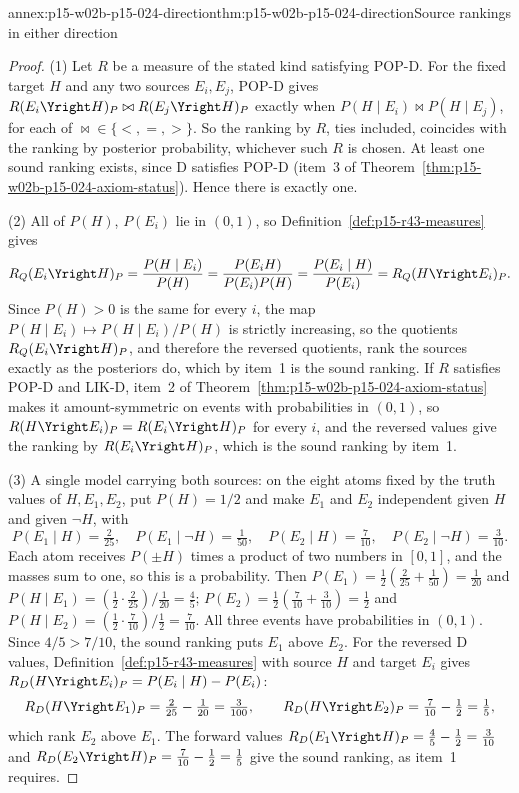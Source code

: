 \begin{annexitem}{annex:p15-w02b-p15-024-direction}{thm:p15-w02b-p15-024-direction}{Source rankings in either direction}
\begin{proof}
(1) Let \(R\) be a measure of the stated kind satisfying POP-D. For
the fixed target \(H\) and any two sources \(E_i,E_j\), POP-D gives
\(R(E_i\Yright H)_P\bowtie R(E_j\Yright H)_P\) exactly when
\(P(H\mid E_i)\bowtie P(H\mid E_j)\), for each of
\(\bowtie\in\{<,=,>\}\). So the ranking by \(R\), ties included,
coincides with the ranking by posterior probability, whichever such
\(R\) is chosen. At least one sound ranking exists, since D satisfies
POP-D (item~3 of Theorem~\ref{thm:p15-w02b-p15-024-axiom-status}).
Hence there is exactly one.

(2) All of \(P(H)\), \(P(E_i)\) lie in \((0,1)\), so
Definition~\ref{def:p15-r43-measures} gives
\[
 R_Q(E_i\Yright H)_P=\frac{P(H\mid E_i)}{P(H)}
 =\frac{P(E_iH)}{P(E_i)P(H)}
 =\frac{P(E_i\mid H)}{P(E_i)}=R_Q(H\Yright E_i)_P .
\]
Since \(P(H)>0\) is the same for every \(i\), the map
\(P(H\mid E_i)\mapsto P(H\mid E_i)/P(H)\) is strictly increasing, so the
quotients \(R_Q(E_i\Yright H)_P\), and therefore the reversed quotients,
rank the sources exactly as the posteriors do, which by item~1 is the
sound ranking. If \(R\) satisfies POP-D and LIK-D, item~2 of
Theorem~\ref{thm:p15-w02b-p15-024-axiom-status} makes it
amount-symmetric on events with probabilities in \((0,1)\), so
\(R(H\Yright E_i)_P=R(E_i\Yright H)_P\) for every \(i\), and the
reversed values give the ranking by \(R(E_i\Yright H)_P\), which is
the sound ranking by item~1.

(3) A single model carrying both sources: on the eight atoms fixed by
the truth values of \(H,E_1,E_2\), put \(P(H)=1/2\) and make \(E_1\)
and \(E_2\) independent given \(H\) and given \(\neg H\), with
\[
 P(E_1\mid H)=\tfrac2{25},\quad P(E_1\mid\neg H)=\tfrac1{50},\quad
 P(E_2\mid H)=\tfrac7{10},\quad P(E_2\mid\neg H)=\tfrac3{10}.
\]
Each atom receives \(P(\pm H)\) times a product of two numbers in
\([0,1]\), and the masses sum to one, so this is a probability. Then
\(P(E_1)=\tfrac12(\tfrac2{25}+\tfrac1{50})=\tfrac1{20}\) and
\(P(H\mid E_1)=(\tfrac12\cdot\tfrac2{25})/\tfrac1{20}=\tfrac45\);
\(P(E_2)=\tfrac12(\tfrac7{10}+\tfrac3{10})=\tfrac12\) and
\(P(H\mid E_2)=(\tfrac12\cdot\tfrac7{10})/\tfrac12=\tfrac7{10}\). All
three events have probabilities in \((0,1)\). Since
\(4/5>7/10\), the sound ranking puts \(E_1\) above \(E_2\). For the
reversed D values, Definition~\ref{def:p15-r43-measures} with source
\(H\) and target \(E_i\) gives \(R_D(H\Yright E_i)_P=P(E_i\mid H)-P(E_i)\):
\[
 R_D(H\Yright E_1)_P=\tfrac2{25}-\tfrac1{20}=\tfrac3{100},\qquad
 R_D(H\Yright E_2)_P=\tfrac7{10}-\tfrac12=\tfrac15 ,
\]
which rank \(E_2\) above \(E_1\). The forward values
\(R_D(E_1\Yright H)_P=\tfrac45-\tfrac12=\tfrac3{10}\) and
\(R_D(E_2\Yright H)_P=\tfrac7{10}-\tfrac12=\tfrac15\) give the sound
ranking, as item~1 requires.
\end{proof}
\end{annexitem}

